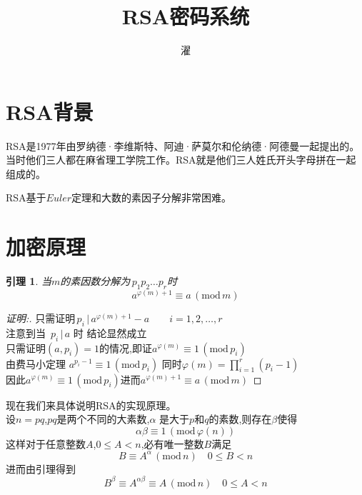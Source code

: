 \documentclass[UTF8]{ctexart}
\title{RSA密码系统}
\author{濯}
\newtheorem{lemma}{引理}[section]
\begin{document}
\maketitle
\tableofcontents
\newpage
\section{RSA背景}
RSA是1977年由罗纳德·李维斯特、阿迪·萨莫尔和伦纳德·阿德曼一起提出的。
当时他们三人都在麻省理工学院工作。RSA就是他们三人姓氏开头字母拼在一起组成的。

RSA基于$Euler$定理和大数的素因子分解非常困难。

\section{加密原理}
\begin{lemma}
    当$m$的素因数分解为\,$p_{1}p_{2} \dots p_{r}$时\\
    \begin{equation*}
        a^{\varphi (m)+1}\equiv a\,(\text{mod}\,m)
    \end{equation*}
\end{lemma}
\begin{proof}[证明:]
    只需证明\,$p_{i}\,|\,a^{\varphi (m)+1}-a \qquad i=1,2,\dots,r$\\
    注意到当\, $p_{i} \, | \,a$ 时 结论显然成立\\
    只需证明$(a,p_{i})=1$的情况,即证$a^{\varphi (m)}\equiv 1\,(\text{mod}\,p_{i})$\\
    由费马小定理 $a^{p_{i}-1}\equiv 1\,(\text{mod}\,p_{i})$
    \quad 同时$\varphi (m)=\prod\limits_{i=1}^{r}(p_{i}-1)$\\
    因此$a^{\varphi (m)}\equiv 1\,(\text{mod}\,p_{i})$\quad 进而$a^{\varphi (m)+1}\equiv a\,(\text{mod}\,m)$
\end{proof}
现在我们来具体说明RSA的实现原理。\\
设$n=pq$,$pq$是两个不同的大素数,$\alpha$ 是大于$p$和$q$的素数,则存在$\beta $使得
\begin{equation*}
    \alpha \beta \equiv 1\,(\text{mod}\,\varphi (n))
\end{equation*}
这样对于任意整数$A$,$0\leq A< n$,必有唯一整数$B$满足
\begin{equation*}
    B \equiv A^{\alpha }\,(\text{mod}\,n) \quad 0\le B<n
\end{equation*}
进而由引理得到
\begin{equation*}
    B^{\beta }\equiv A^{\alpha \beta}\equiv A\,(\text{mod}\,n) \quad 0\le A<n
\end{equation*}
\end{document}
